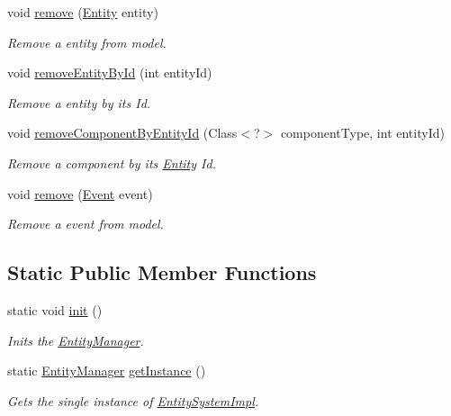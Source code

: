 \begin{DoxyCompactItemize}
void \hyperlink{classbr_1_1unb_1_1unbomber_1_1core_1_1_entity_manager_impl_a338c6539edb0fbca682fb29121490053}{remove} (\hyperlink{classbr_1_1unb_1_1unbomber_1_1core_1_1_entity}{Entity} entity)
\begin{DoxyCompactList}\small\item\em Remove a entity from model. \end{DoxyCompactList}\item 
void \hyperlink{classbr_1_1unb_1_1unbomber_1_1core_1_1_entity_manager_impl_ad58fb840a3c90141e01115e9342f4219}{remove\+Entity\+By\+Id} (int entity\+Id)
\begin{DoxyCompactList}\small\item\em Remove a entity by its Id. \end{DoxyCompactList}\item 
void \hyperlink{classbr_1_1unb_1_1unbomber_1_1core_1_1_entity_manager_impl_aa3130a05fa3589b27758250a3700ad24}{remove\+Component\+By\+Entity\+Id} (Class$<$?$>$ component\+Type, int entity\+Id)
\begin{DoxyCompactList}\small\item\em Remove a component by its \hyperlink{classbr_1_1unb_1_1unbomber_1_1core_1_1_entity}{Entity} Id. \end{DoxyCompactList}\item 
void \hyperlink{classbr_1_1unb_1_1unbomber_1_1core_1_1_entity_manager_impl_a24f41aeffed42b31787639ec6f223bd1}{remove} (\hyperlink{classbr_1_1unb_1_1unbomber_1_1core_1_1_event}{Event} event)
\begin{DoxyCompactList}\small\item\em Remove a event from model. \end{DoxyCompactList}\end{DoxyCompactItemize}
\subsection*{Static Public Member Functions}
\begin{DoxyCompactItemize}
\item 
static void \hyperlink{classbr_1_1unb_1_1unbomber_1_1core_1_1_entity_manager_impl_ade23c489b4633ba68401b12c726a4868}{init} ()
\begin{DoxyCompactList}\small\item\em Inits the \hyperlink{interfacebr_1_1unb_1_1unbomber_1_1core_1_1_entity_manager}{Entity\+Manager}. \end{DoxyCompactList}\item 
static \hyperlink{interfacebr_1_1unb_1_1unbomber_1_1core_1_1_entity_manager}{Entity\+Manager} \hyperlink{classbr_1_1unb_1_1unbomber_1_1core_1_1_entity_manager_impl_ae321c78a808b5b9fa52efcd69d73893e}{get\+Instance} ()
\begin{DoxyCompactList}\small\item\em Gets the single instance of \hyperlink{classbr_1_1unb_1_1unbomber_1_1core_1_1_entity_system_impl}{Entity\+System\+Impl}. \end{DoxyCompactList}\end{DoxyCompactItemize}
